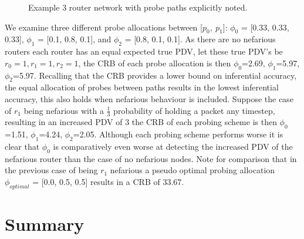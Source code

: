 \begin{figure}[H]
    \centering
    \caption{Example 3 router network with probe paths explicitly noted.}
    \label{fig:fimex3routereg}
\end{figure}

We examine three different probe allocations between [$p_0,\:p_1$]: $\phi_0$ = [0.33, 0.33, 0.33],  $\phi_1$ = [0.1, 0.8, 0.1], and $\phi_2$ = [0.8, 0.1, 0.1]. As there are no nefarious routers each router has an equal expected true PDV, let these true PDV's be $r_0=1, r_1=1, r_2=1$, the CRB of each probe allocation is then $\phi_0$=2.69, $\phi_1$=5.97, $\phi_2$=5.97. Recalling that the CRB provides a lower bound on inferential accuracy, the equal allocation of probes between paths results in the lowest inferential accuracy, this also holds when nefarious behaviour is included. Suppose the case of $r_1$ being nefarious with a $\frac{1}{3}$ probability of holding a packet any timestep, resulting in an increased PDV of 3 the CRB of each probing scheme is then $\phi_0$=1.51, $\phi_1$=4.24, $\phi_2$=2.05. Although each probing scheme performs worse it is clear that $\phi_0$ is comparatively even worse at detecting the increased PDV of the nefarious router than the case of no nefarious nodes. Note for comparison that in the previous case of being $r_1$ nefarious a pseudo optimal probing allocation $\phi_{optimal}$ = [0.0, 0.5, 0.5] results in a CRB of 33.67.

\section{Summary}
